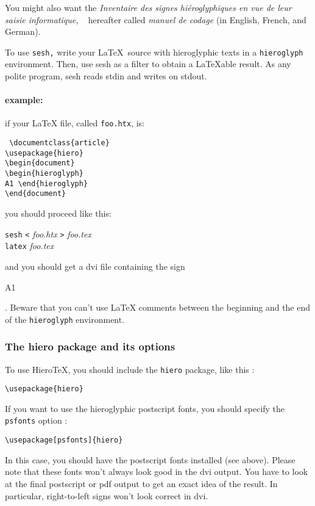 \documentclass[final]{article}
\newcommand{\HieroTeX}{Hiero\TeX{}}
\begin{document}
You might also want the {\em Inventaire des signes hi\'eroglyphiques
  en vue de leur saisie informatique, \/}~\cite{MANCOD} hereafter
called {\em manuel de codage\/} (in English, French, and German).

To use \texttt{sesh,} write your \LaTeX\ source with hieroglyphic texts in a
\verb|hieroglyph| environment. Then, use sesh as a filter to obtain a 
\LaTeX able result. As any polite program, sesh reads stdin and writes
on stdout. 

\paragraph{example:} 
if your \LaTeX{} file, called \verb/foo.htx/, is:
\begin{flushleft} \tt
  \verb/\/\verb/documentclass{article}/\\
  \verb/\/\verb/usepackage{hiero}/\\
  \verb.\.\verb/begin{document}/ \\
  \verb.\.\verb/begin{hieroglyph}/\\
  A1
  \verb/\/\verb/end{hieroglyph}/\\
  \verb/\/\verb/end{document}/\\
\end{flushleft}
you should proceed like this:
\begin{flushleft}
  \texttt{sesh} \texttt{<} \textsl{foo.htx} \texttt{>} \textsl{foo.tex}\\
  \texttt{latex} {\sl foo.tex}
\end{flushleft}
and you should get a dvi file containing the sign 
\begin{hieroglyph}
  A1
\end{hieroglyph}.
Beware that you can't use \LaTeX{} comments between the 
beginning and the end of the \verb/hieroglyph/ environment. 


\subsubsection{The hiero package and its options}

To use \HieroTeX{}, you should include the \texttt{hiero} package,
like this :
\begin{verbatim}
\usepackage{hiero}
\end{verbatim}

If you want to use the hieroglyphic postscript fonts, you should specify the \texttt{psfonts} option :
\begin{verbatim}
\usepackage[psfonts]{hiero}
\end{verbatim}
In this case, you should have the postscript fonts installed (see
above). Please note that these fonts won't always look good in the dvi
output. You have to look at the final postscript or pdf output to get
an exact idea of the result. In particular, right-to-left signs won't
look correct in dvi.
\end{document}
